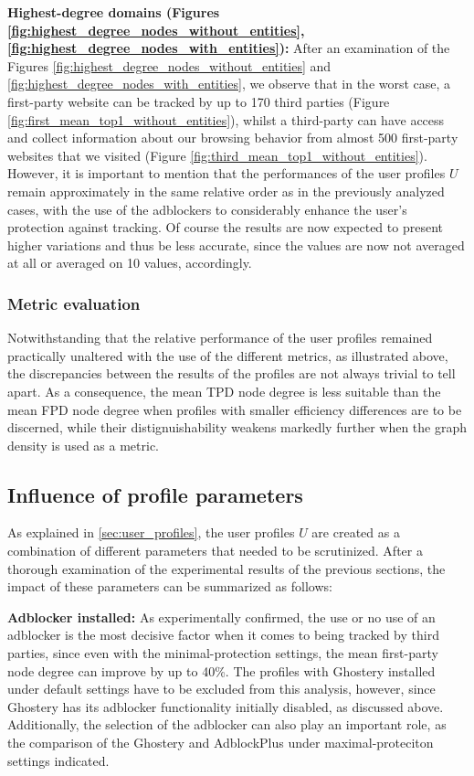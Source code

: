 \documentclass{sig-alternate}
\begin{document}
\textbf{Highest-degree domains (Figures \ref{fig:highest_degree_nodes_without_entities}, \ref{fig:highest_degree_nodes_with_entities}):} After an examination of the Figures \ref{fig:highest_degree_nodes_without_entities} and \ref{fig:highest_degree_nodes_with_entities}, we observe that in the worst case, a first-party website can be tracked by up to 170 third parties (Figure \ref{fig:first_mean_top1_without_entities}), whilst a third-party can have access and collect information about our browsing behavior from almost 500 first-party websites that we visited (Figure \ref{fig:third_mean_top1_without_entities}). However, it is important to mention that the performances of the user profiles $U$ remain approximately in the same relative order as in the previously analyzed cases, with the use of the adblockers to considerably enhance the user's protection against tracking. Of course the results are now expected to present higher variations and thus be less accurate, since the values are now not averaged at all or averaged on 10 values, accordingly.

\subsubsection{Metric evaluation}
Notwithstanding that the relative performance of the user profiles remained practically unaltered with the use of the different metrics, as illustrated above, the discrepancies between the results of the profiles are not always trivial to tell apart. As a consequence, the mean TPD node degree is less suitable than the mean FPD node degree when profiles with smaller efficiency differences are to be discerned, {\color{blue}while their distignuishability weakens markedly further when the graph density is used as a metric}.


\subsection{Influence of profile parameters}
As explained in \ref{sec:user_profiles}, the user profiles $U$ are created as a combination of different parameters that needed to be scrutinized. After a thorough examination of the experimental results of the previous sections, the impact of these parameters can be summarized as follows:

\textbf{Adblocker installed:} As experimentally confirmed, the use or no use of an adblocker is the most decisive factor when it comes to being tracked by third parties, since even with the minimal-protection settings, the mean first-party node degree can improve by up to 40\%. The profiles with Ghostery installed under default settings have to be excluded from this analysis, however, since Ghostery has its adblocker functionality initially disabled, as discussed above. Additionally, the selection of the adblocker can also play an important role, as the comparison of the Ghostery and AdblockPlus under maximal-proteciton settings indicated.
\end{document}
